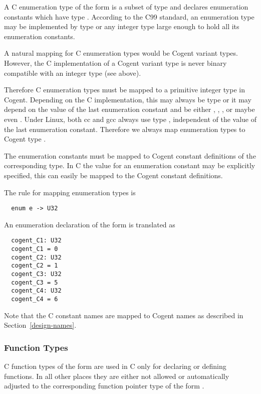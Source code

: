 A C enumeration type of the form  is a subset of type  and declares enumeration 
constants which have type . According to the C99 standard, an enumeration type may be implemented
by type  or any integer type large enough to hold all its enumeration constants.

A natural mapping for C enumeration types would be Cogent variant types. However, the C implementation
of a Cogent variant type is never binary compatible with an integer type (see above). 

Therefore C enumeration types must be mapped to a primitive integer type in Cogent. Depending on the C
implementation, this may always be type  or it may depend on the value of the last enumeration
constant and be either , , , or maybe even . Under Linux, both cc
and gcc always use type , independent of the value of the last enumeration constant. 
Therefore we always map enumeration types to Cogent type .

The enumeration constants must be mapped to Cogent constant definitions of the corresponding type. In 
C the value for an enumeration constant may be explicitly specified, this can easily be mapped to
the Cogent constant definitions.

The rule for mapping enumeration types is
\begin{verbatim}
  enum e -> U32
\end{verbatim}

An enumeration declaration of the form  is translated as
\begin{verbatim}
  cogent_C1: U32
  cogent_C1 = 0
  cogent_C2: U32
  cogent_C2 = 1
  cogent_C3: U32
  cogent_C3 = 5
  cogent_C4: U32
  cogent_C4 = 6
\end{verbatim}
Note that the C constant names are mapped to Cogent names as described in Section~\ref{design-names}.

\subsubsection{Function Types}
\label{design-types-function}

C function types of the form  are used in C only for declaring or defining functions. In all other
places they are either not allowed or automatically adjusted to the corresponding function pointer type
of the form . 

